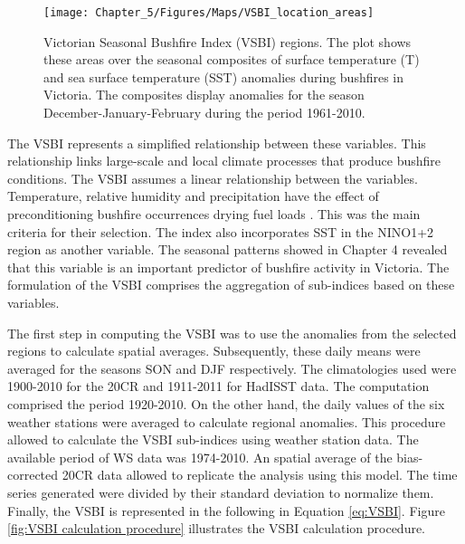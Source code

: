 \begin{figure}[h]
\noindent \begin{centering}
\texttt{[image: Chapter\_5/Figures/Maps/VSBI\_location\_areas]}
\par\end{centering}

\caption[Victorian Seasonal Bushfire Index (VSBI) regions]{Victorian Seasonal Bushfire Index (VSBI) regions. The plot shows these
areas over the seasonal composites of surface temperature (T) and
sea surface temperature (SST) anomalies during bushfires in Victoria.
The composites display anomalies for the season December-January-February
during the period 1961-2010. \label{fig: Victorian Seasonal Bushfire Index (VSBI) regions}}


\end{figure}


The VSBI represents a simplified relationship between these variables.
This relationship links large-scale and local climate processes that
produce bushfire conditions. The VSBI assumes a linear relationship
between the variables. Temperature, relative humidity and precipitation
have the effect of preconditioning bushfire occurrences drying fuel
loads \citep{BoM2009}. This was the main criteria for their selection.
The index also incorporates SST in the NINO1+2 region as another variable.
The seasonal patterns showed in Chapter 4 revealed that this variable
is an important predictor of bushfire activity in Victoria. The formulation
of the VSBI comprises the aggregation of sub-indices based on these
variables. 

The first step in computing the VSBI was to use the anomalies from
the selected regions to calculate spatial averages. Subsequently,
these daily means were averaged for the seasons SON and DJF respectively.
The climatologies used were 1900-2010 for the 20CR and 1911-2011 for
HadISST data. The computation comprised the period 1920-2010. On the
other hand, the daily values of the six weather stations were averaged
to calculate regional anomalies. This procedure allowed to calculate
the VSBI sub-indices using weather station data. The available period
of WS data was 1974-2010. An spatial average of the bias-corrected
20CR data allowed to replicate the analysis using this model. The
time series generated were divided by their standard deviation to
normalize them. Finally, the VSBI is represented in the following
in Equation \ref{eq:VSBI}. Figure \ref{fig:VSBI calculation procedure}
illustrates the VSBI calculation procedure.

